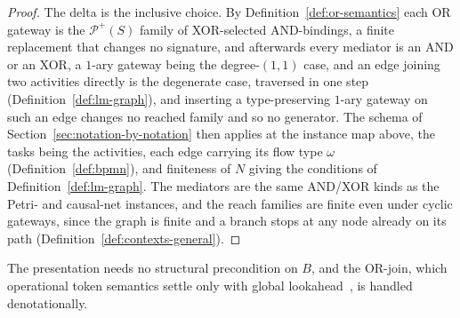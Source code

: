 \begin{proof}
  The delta is the inclusive choice. By Definition~\ref{def:or-semantics} each OR gateway is the
  $\mathcal{P}^+(S)$ family of XOR-selected AND-bindings, a finite replacement that changes no
  signature, and afterwards every mediator is an AND or an XOR, a $1$-ary gateway being the
  degree-$(1,1)$ case, and an edge joining two activities directly is the degenerate case,
  traversed in one step (Definition~\ref{def:lm-graph}), and inserting a type-preserving $1$-ary
  gateway on such an edge changes no reached family and so no generator. The schema of Section~\ref{sec:notation-by-notation} then applies at the instance
  map above, the tasks being the activities, each edge carrying its flow type $\omega$
  (Definition~\ref{def:bpmn}), and finiteness of $N$ giving the conditions of
  Definition~\ref{def:lm-graph}. The mediators are the same AND/XOR kinds as the Petri- and
  causal-net instances, and the reach families are finite even under cyclic gateways, since the
  graph is finite and a branch stops at any node already on its path
  (Definition~\ref{def:contexts-general}).
\end{proof}

The presentation needs no structural precondition on $B$, and the OR-join, which operational token semantics settle only with global lookahead~\cite{dijkmanSemanticsAnalysisBusiness2008}, is handled denotationally.

